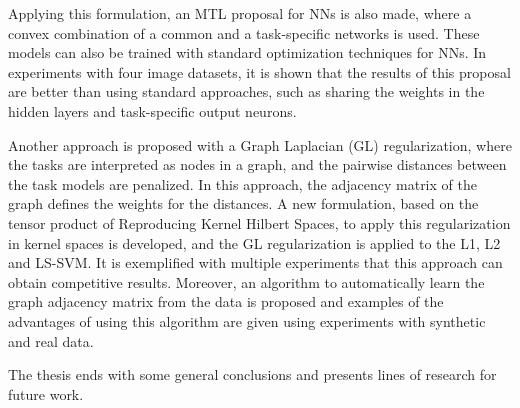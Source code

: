 \documentclass[a4paper, 11pt]{Thesis}  %
\begin{document}
{{  %
  Applying this formulation, an MTL proposal for NNs is also made, where a convex combination of a common and a task-specific networks is used. These models can also be trained with standard optimization techniques for NNs.
  In experiments with four image datasets, it is shown that the results of this proposal are better than using standard approaches, such as sharing the weights in the hidden layers and task-specific output neurons.
  
  
  Another approach is proposed with a Graph Laplacian (GL) regularization, where the tasks are interpreted as nodes in a graph, and the pairwise distances between the task models are penalized. In this approach, the adjacency matrix of the graph defines the weights for the distances. A new formulation, based on the tensor product of Reproducing Kernel Hilbert Spaces, to apply this regularization in kernel spaces is developed, and the GL regularization is applied to the L1, L2 and LS-SVM. 
  It is exemplified with multiple experiments that this approach can obtain competitive results. 
  Moreover, an algorithm to automatically learn the graph adjacency matrix from the data is proposed and examples of the advantages of using this algorithm are given using experiments with synthetic and real data.
  
  The thesis ends with some general conclusions and presents lines of research for future work. 
}

}

\clearpage  %
\end{document}
